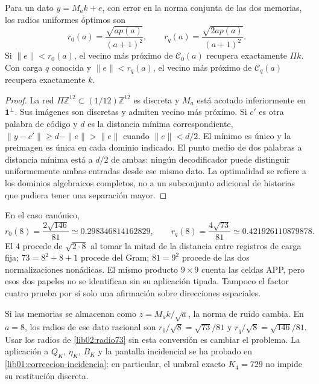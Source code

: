\begin{theorem}
\label{lib02:radios-memoria}
Para un dato \(y=M_ak+e\), con error en la norma conjunta de las dos
memorias, los radios uniformes óptimos son
\begin{equation}
 r_0(a)=\frac{\sqrt{ap(a)}}{(a+1)^2},\qquad
 r_q(a)=\frac{\sqrt{2ap(a)}}{(a+1)^2}.
 \label{lib02:radios}
\end{equation}
Si \(\|e\|<r_0(a)\), el vecino más próximo de
\(\mathcal C_0(a)\) recupera exactamente \(\Pi k\). Con carga
\(q\) conocida y \(\|e\|<r_q(a)\), el vecino más próximo de
\(\mathcal C_q(a)\) recupera exactamente \(k\).
\end{theorem}
\begin{proof}
La red \(\Pi\mathbb Z^{12}\subset(1/12)\mathbb Z^{12}\) es
discreta y \(M_a\) está acotado inferiormente en
\(\mathbf1^\perp\). Sus imágenes son discretas y admiten vecino
más próximo. Si \(c'\) es otra palabra de código y \(d\) es la
distancia mínima correspondiente,
\(\|y-c'\|\geq d-\|e\|>\|e\|\) cuando \(\|e\|<d/2\).
El mínimo es único y la preimagen es única en cada dominio indicado.
El punto medio de dos palabras a distancia mínima está a \(d/2\)
de ambas: ningún decodificador puede distinguir uniformemente ambas
entradas desde ese mismo dato. La optimalidad se refiere a los dominios
algebraicos completos, no a un subconjunto adicional de historias que
pudiera tener una separación mayor.
\end{proof}

En el caso canónico,
\begin{equation}
 r_0(8)=\frac{2\sqrt{146}}{81}\simeq0.298346814162829,
 \qquad
 r_q(8)=\frac{4\sqrt{73}}{81}\simeq0.421926110879878.
 \label{lib02:radio73}
\end{equation}
El \(4\) procede de \(\sqrt{2\cdot8}\) al tomar la mitad de la
distancia entre registros de carga fija; \(73=8^2+8+1\) procede del
Gram; \(81=9^2\) procede de las dos normalizaciones nonádicas. El mismo
producto \(9\times9\) cuenta las celdas APP, pero esos dos papeles
no se identifican sin su aplicación tipada. Tampoco el factor cuatro
prueba por sí solo una afirmación sobre direcciones espaciales.

Si las memorias se almacenan como \(z=M_ak/\sqrt a\), la norma de
ruido cambia. En \(a=8\), los radios de ese dato racional son
\(r_0/\sqrt8=\sqrt{73}/81\) y
\(r_q/\sqrt8=\sqrt{146}/81\). Usar los radios de
\eqref{lib02:radio73} sin esta conversión es cambiar el problema.
La aplicación a \(Q_K\), \(\eta_K\), \(B_K\) y la pantalla
incidencial se ha probado en \cref{lib01:correccion-incidencia}; en
particular, el umbral exacto \(K_4=729\) no impide su restitución
discreta.

